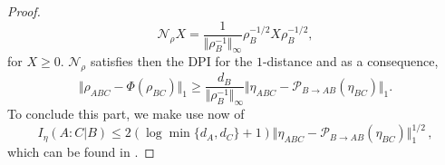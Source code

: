 \documentclass[11pt]{article}
\theoremstyle{newdefinition}
\theoremstyle{newplain}
\theoremstyle{myplain}
\DeclareMathOperator{\1}{\mathds{1}}
\begin{document}
{\begin{proof}
\begin{equation}
    \mathcal{N}_{\rho}X=\frac{1}{\Vert \rho_B^{-1}\Vert_{\infty}}\rho_B^{-1/2}X \rho_B^{-1/2},
    \end{equation}
    for $X\geq 0$. $\mathcal{N}_{\rho}$ satisfies then the DPI for the $1$-distance and as a consequence,
\begin{equation}
        \Vert \rho_{ABC}-\Phi(\rho_{BC})\Vert_1\geq  \frac{d_B}{\Vert \rho_B^{-1}\Vert_{\infty}}\Vert \eta_{ABC}-\mathcal{P}_{B\rightarrow AB}(\eta_{BC})\Vert_1.
    \end{equation}
    To conclude this part, we make use now of 
    \begin{equation}
        I_{\eta}(A:C\vert B)\leq 2 (\log\min\{d_A,d_C\}+1)\Vert \eta_{ABC}-\mathcal{P}_{B\rightarrow AB}(\eta_{BC})\Vert_1^{1/2} \, ,
    \end{equation}
    which can be found in \cite{bluhm2023general}.  
   

\end{proof}}
\end{document}
